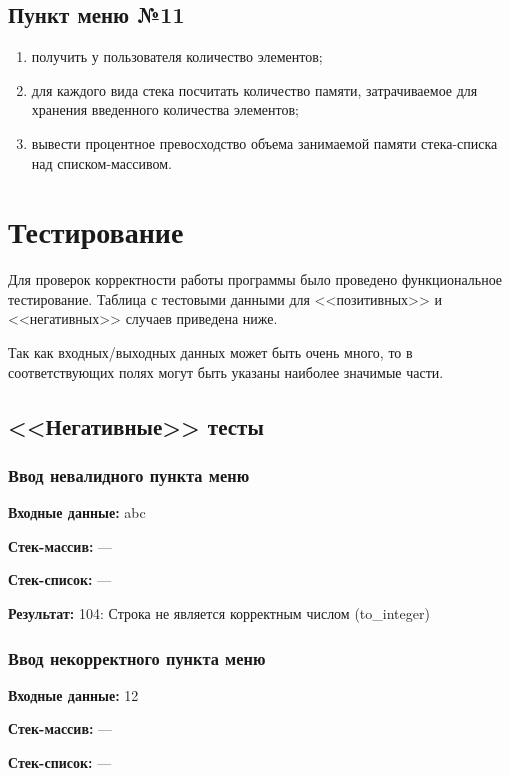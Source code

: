 \documentclass[a4paper,12pt]{extarticle}
\begin{document}
\subsection{Пункт меню №11}
\begin{enumerate}
    \item получить у пользователя количество элементов;
    \item для каждого вида стека посчитать количество памяти, затрачиваемое для хранения введенного количества элементов;
    \item вывести процентное превосходство объема занимаемой памяти стека-списка над списком-массивом.
\end{enumerate}

\newpage

\section{Тестирование}
Для проверок корректности работы программы было проведено функциональное тестирование. Таблица с тестовыми данными для <<позитивных>> и <<негативных>> случаев приведена ниже.

Так как входных/выходных данных может быть очень много, то в соответствующих полях могут быть указаны наиболее значимые части.

\subsection{<<Негативные>> тесты}
\subsubsection{Ввод невалидного пункта меню}

\textbf{Входные данные: }
abc

\textbf{Стек-массив: }
---

\textbf{Стек-список: }
---

\textbf{Результат: }
104: Строка не является корректным числом (to\_integer)


\subsubsection{Ввод некорректного пункта меню}

\textbf{Входные данные: }
12

\textbf{Стек-массив: }
---

\textbf{Стек-список: }
---
\end{document}
